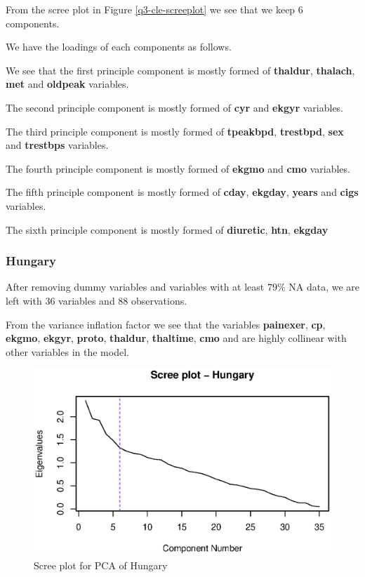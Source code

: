 \documentclass[a4paper]{article}
\begin{document}
From the scree plot in Figure \ref{q3-cle-screeplot} we see that we keep 6 components.

We have the loadings of each components as follows.



We see that the first principle component is mostly formed of \textbf{thaldur}, \textbf{thalach}, \textbf{met} and \textbf{oldpeak} variables.

The second principle component is mostly formed of \textbf{cyr} and \textbf{ekgyr} variables.

The third principle component is mostly formed of \textbf{tpeakbpd}, \textbf{trestbpd}, \textbf{sex} and \textbf{trestbps} variables.

The fourth principle component is mostly formed of \textbf{ekgmo} and \textbf{cmo} variables.

The fifth principle component is mostly formed of \textbf{cday}, \textbf{ekgday}, \textbf{years} and \textbf{cigs} variables.

The sixth principle component is mostly formed of \textbf{diuretic}, \textbf{htn}, \textbf{ekgday}

\subsubsection{Hungary}

After removing dummy variables and variables with at least $79\%$ NA data, we are left with 36 variables and 88 observations. 



From the variance inflation factor we see that the variables \textbf{painexer}, \textbf{cp}, \textbf{ekgmo}, \textbf{ekgyr}, \textbf{proto}, \textbf{thaldur}, \textbf{thaltime}, \textbf{cmo} and  are highly collinear with other variables in the model.

\begin{figure}[H]
	\begin{center}
		\includegraphics[width=12cm]{question3output/hunscreeplot.eps}
	\end{center}
	\caption{Scree plot for PCA of Hungary}
	\label{q3-hun-screeplot}
\end{figure}
\end{document}
